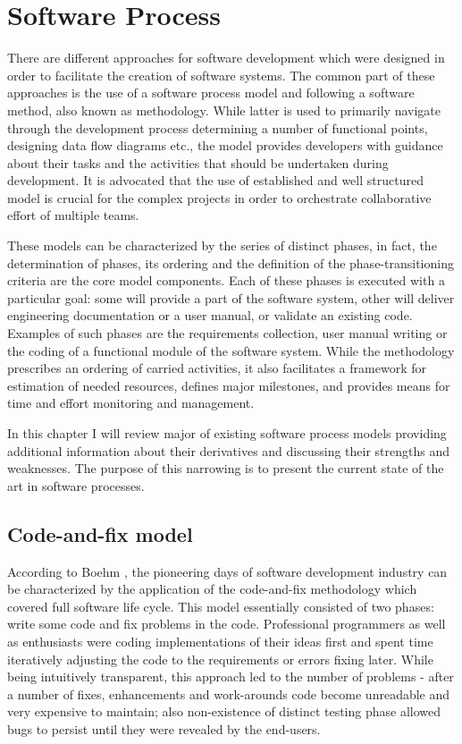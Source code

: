 \chapter{Software Process}
There are different approaches for software development which were designed in order to 
facilitate the creation of software systems. The common part of these approaches is the use 
of a software process model and following a software method, also known as methodology.
While latter is used to primarily navigate through the development process determining
a number of functional points, designing data flow diagrams etc., the model provides 
developers with guidance about their tasks and the activities that should be undertaken 
during development. It is advocated that the use of established and well structured 
model is crucial for the complex projects in order to orchestrate collaborative effort 
of multiple teams. 

These models can be characterized by the series of distinct phases, in fact, the 
determination of phases, its ordering and the definition of the phase-transitioning 
criteria are the core model components.
Each of these phases is executed with a particular goal: some will provide a part of the 
software system, other will deliver engineering documentation or a user manual, or 
validate an existing code. Examples of such phases are the requirements collection, 
user manual writing or the coding of a functional module of the software system. 
While the methodology prescribes an ordering of carried activities, it also facilitates
a framework for estimation of needed resources, defines major milestones, and provides 
means for time and effort monitoring and management. 

In this chapter I will review major of existing software process models providing additional 
information about their derivatives and discussing their strengths and weaknesses.
The purpose of this narrowing is to present the current state of the art in software 
processes.

\section{Code-and-fix model}
According to Boehm \cite{citeulike:10002126}, the pioneering days of software development 
industry can be characterized by the application of the code-and-fix methodology
which covered full software life cycle. This model essentially consisted of two phases:
write some code and fix problems in the code. Professional programmers as well as enthusiasts 
were coding implementations of their ideas first and spent time iteratively adjusting the 
code to the requirements or errors fixing later. While being intuitively transparent, this 
approach led to the number of problems - after a number of fixes, enhancements and 
work-arounds code become unreadable and very expensive to maintain; also non-existence of
distinct testing phase allowed bugs to persist until they were revealed by the end-users.

